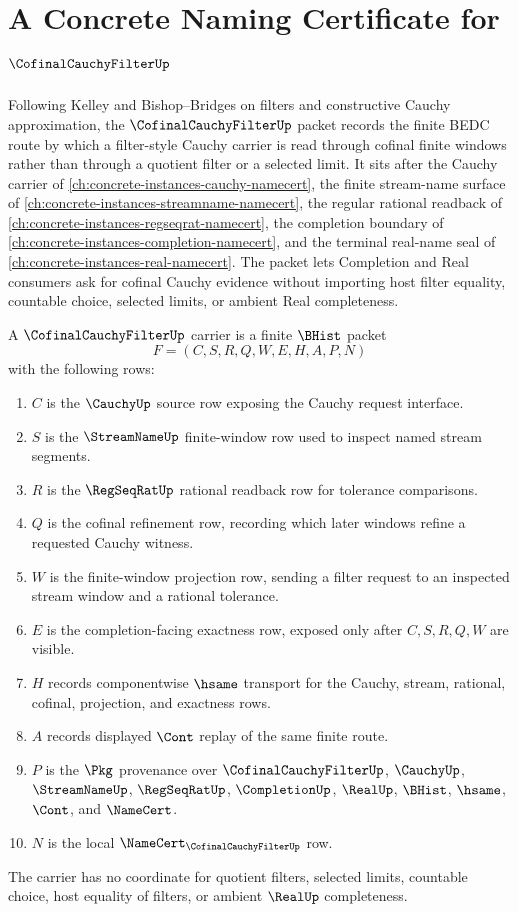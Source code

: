 \chapter{A Concrete Naming Certificate for $\CofinalCauchyFilterUp$}
\label{ch:concrete-instances-cofinal-cauchy-filter-namecert}

Following Kelley and Bishop--Bridges on filters and constructive Cauchy approximation, the $\CofinalCauchyFilterUp$ packet records the finite BEDC route by which a filter-style Cauchy carrier is read through cofinal finite windows rather than through a quotient filter or a selected limit. It sits after the Cauchy carrier of \autoref{ch:concrete-instances-cauchy-namecert}, the finite stream-name surface of \autoref{ch:concrete-instances-streamname-namecert}, the regular rational readback of \autoref{ch:concrete-instances-regseqrat-namecert}, the completion boundary of \autoref{ch:concrete-instances-completion-namecert}, and the terminal real-name seal of \autoref{ch:concrete-instances-real-namecert}. The packet lets Completion and Real consumers ask for cofinal Cauchy evidence without importing host filter equality, countable choice, selected limits, or ambient Real completeness.

\begin{definition}
\label{def:cofinal-cauchy-filter-carrier}
A $\CofinalCauchyFilterUp$ carrier is a finite $\BHist$ packet
$$
F=(C,S,R,Q,W,E,H,A,P,N)
$$
with the following rows:
\begin{enumerate}
\item $C$ is the $\CauchyUp$ source row exposing the Cauchy request interface.
\item $S$ is the $\StreamNameUp$ finite-window row used to inspect named stream segments.
\item $R$ is the $\RegSeqRatUp$ rational readback row for tolerance comparisons.
\item $Q$ is the cofinal refinement row, recording which later windows refine a requested Cauchy witness.
\item $W$ is the finite-window projection row, sending a filter request to an inspected stream window and a rational tolerance.
\item $E$ is the completion-facing exactness row, exposed only after $C,S,R,Q,W$ are visible.
\item $H$ records componentwise $\hsame$ transport for the Cauchy, stream, rational, cofinal, projection, and exactness rows.
\item $A$ records displayed $\Cont$ replay of the same finite route.
\item $P$ is the $\Pkg$ provenance over $\CofinalCauchyFilterUp$, $\CauchyUp$, $\StreamNameUp$, $\RegSeqRatUp$, $\CompletionUp$, $\RealUp$, $\BHist$, $\hsame$, $\Cont$, and $\NameCert$.
\item $N$ is the local $\NameCert_{\CofinalCauchyFilterUp}$ row.
\end{enumerate}
The carrier has no coordinate for quotient filters, selected limits, countable choice, host equality of filters, or ambient $\RealUp$ completeness.
\end{definition}

